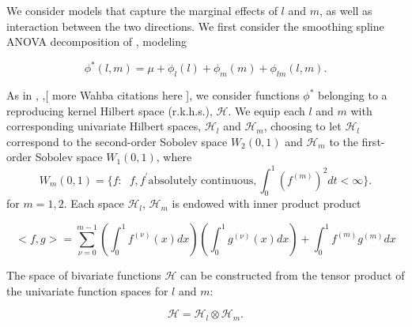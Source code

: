 \documentclass[12pt]{article}
\theoremstyle{definition}
\begin{document}
We consider models that capture the marginal effects of $l$ and $m$, as well as interaction between the two directions. We first consider the smoothing spline ANOVA decomposition of \citet{gu2002smoothing},  modeling 

\begin{equation}
\phi^*\left(l,m\right) = \mu + \phi_l\left(l\right) + \phi_m\left(m\right) + \phi_{lm}\left(l,m\right).   \label{eq:ANOVA}
\end{equation}
\noindent 

As in \citet{gu2002smoothing}, \citet{craven1978smoothing},[ more Wahba citations here ], we consider functions $\phi^*$ belonging to a reproducing kernel Hilbert space (r.k.h.s.), $\mathcal{H}$. We equip each $l$ and $m$  with corresponding univariate Hilbert spaces, $\mathcal{H}_l$ and $\mathcal{H}_m$, choosing to let $\mathcal{H}_l$ correspond to the second-order Sobolev space $W_2\left(0,1\right)$ and $\mathcal{H}_m$ to the first-order Sobolev space $W_1\left(0,1\right)$, where
\[
W_m\left(0,1\right) = \lbrace f: \;\;f, f^\prime \mbox{absolutely continuous}, \int_0^1 \left(f^{\left( m \right)}\right)^2 dt < \infty \rbrace.
\]
\noindent
for $m=1, 2$. Each space $\mathcal{H}_l$, $\mathcal{H}_m$ is endowed with inner product  product

\begin{equation} \label{eq:inner_product}
\big < f, g \big > = \sum_{\nu=0}^{m-1} \left( \int_0^1 f^{\left( \nu \right)}\left(x\right) dx \right)\left( \int_0^1 g^{\left( \nu \right)}\left(x\right) dx \right) + \int_0^1 f^{\left( m \right)} g^{\left( m \right)}dx
\end{equation}

 The space of bivariate functions $\mathcal{H}$ can be constructed from the tensor product of the univariate function spaces for $l$ and $m$:

\[
\mathcal{H} = \mathcal{H}_l \otimes \mathcal{H}_m.
\]
\noindent
\end{document}
